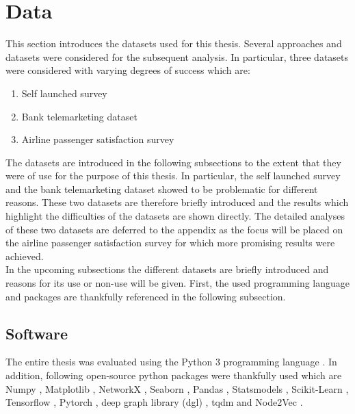 
  \section{Data}
  
  This section introduces the datasets used for this thesis. Several approaches
  and datasets were considered for the subsequent analysis. In particular, three
  datasets were considered with varying degrees of success which are:

  \begin{enumerate}
    \item Self launched survey
    \item Bank telemarketing dataset
    \item Airline passenger satisfaction survey
  \end{enumerate}

  \noindent The datasets are introduced in the following subsections to the
  extent that they were of use for the purpose of this thesis. In particular,
  the self launched survey and the bank telemarketing dataset showed to be
  problematic for different reasons. These two datasets are therefore briefly
  introduced and the results which highlight the difficulties of the datasets
  are shown directly. The detailed analyses of these two datasets are deferred
  to the appendix as the focus will be placed on the airline passenger
  satisfaction survey for which more promising results were achieved. \\ 

  \noindent In the upcoming subsections the different datasets are briefly 
  introduced and reasons for its use or non-use will be given. First, the used
  programming language and packages are thankfully referenced in the following
  subsection.

  \subsection{Software}

  The entire thesis was evaluated using the Python 3 programming
  language \citep{vanRossum2009}. In addition, following open-source python
  packages were thankfully used which are Numpy \citep{harris2020array},
  Matplotlib \citep{Hunter2007}, NetworkX \citep{hagberg2008exploring}, Seaborn
  \citep{Waskom2021}, Pandas \citep{mckinney2010data}, Statsmodels
  \citep{seabold2010statsmodels}, Scikit-Learn \citep{pedregosa2011scikit},
  Tensorflow \citep{abadi2016tensorflow}, Pytorch \citep{paszke2019pytorch},
  deep graph library (dgl) \citep{wang2019deep}, tqdm \citep{da2021tqdm} and
  Node2Vec \citep{Cohen2021}. 


